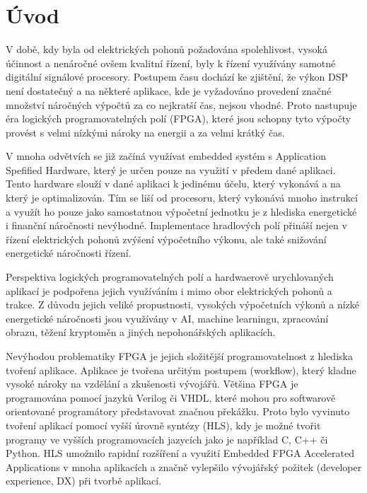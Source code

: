 \documentclass[a4paper, twoside, 11pt]{article}
\begin{document}
\newpage
\tableofcontents
\newpage%
\flushbottom %
\newpage
\vspace{0pt}
\listoffigures %
\flushbottom %
\newpage
\listoftables
\flushbottom
\newpage


\null\newpage
\null\newpage %
\setcounter{page}{1}

\section{Úvod}
V době, kdy byla od elektrických pohonů požadována spolehlivost, vysoká účinnost a nenáročné ovšem kvalitní řízení, byly k řízení využívány samotné digitální signálové procesory. Postupem času dochází ke zjištění, že výkon DSP není dostatečný a na některé aplikace, kde je vyžadováno provedení značné množství náročných výpočtů za co nejkratší čas, nejsou vhodné. Proto nastupuje éra logických programovatelných polí (FPGA), které jsou schopny tyto výpočty provést s velmi nízkými nároky na energii a za velmi krátký čas.\par
V mnoha odvětvích se již začíná využívat embedded systém s Application Spefified Hardware, který je určen pouze na využití v předem dané aplikaci. Tento hardware slouží v dané aplikaci k jedinému účelu, který vykonává a na který je optimalizován. Tím se liší od procesoru, který vykonává mnoho instrukcí a využít ho pouze jako samostatnou výpočetní jednotku je z hlediska energetické i finanční náročnosti nevýhodné. Implementace hradlových polí přináší nejen v řízení elektrických pohonů zvýšení výpočetního výkonu, ale také snižování energetické náročnosti řízení.\par
Perspektiva logických programovatelných polí a hardwaerově urychlovaných aplikací je podpořena jejich využíváním i mimo obor elektrických pohonů a trakce. Z důvodu jejich veliké propustnosti, vysokých výpočetních výkonů a nízké energetické náročnosti jsou využívány v AI, machine learningu, zpracování obrazu, těžení kryptoměn a jiných nepohonářských aplikacích.\par
Nevýhodou problematiky FPGA je jejich složitější programovatelnost z hlediska tvoření aplikace. Aplikace je tvořena určitým postupem (workflow), který kladne vysoké nároky na vzdělání a zkušenosti vývojářů. Většina FPGA je programována pomocí jazyků Verilog či VHDL, které mohou pro softwarově orientované programátory představovat značnou překážku. Proto bylo vyvinuto tvoření aplikací pomocí vyšší úrovně syntézy (HLS), kdy je možné tvořit programy ve vyšších programovacích jazycích jako je například C, C++ či Python. HLS umožnilo rapidní rozšíření a využití Embedded FPGA Accelerated Applications v mnoha aplikacích a značně vylepšilo vývojářský požitek (developer experience, DX) při tvorbě aplikací.\par
\end{document}
